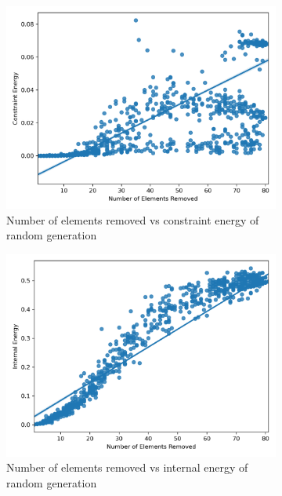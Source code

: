 \begin{figure}[H]
	\centering
	\begin{subfigure}[t]{0.45\textwidth}
		\centering
		\includegraphics[width=\textwidth]{ne_ce_r.png}
		\caption{Number of elements removed vs constraint energy of random generation}
	\end{subfigure}
	\hfill
	\begin{subfigure}[t]{0.45\textwidth}
		\centering
		\includegraphics[width=\textwidth]{ne_ie_r.png}
		\caption{Number of elements removed vs internal energy of random generation}
	\end{subfigure}
	\hfill
	\begin{subfigure}[t]{0.45\textwidth}
		\centering

\end{subfigure}
\end{figure}
